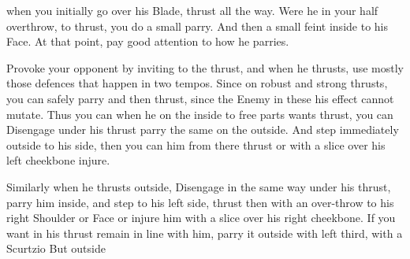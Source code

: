 \newpage


\newpage


when you initially go over his Blade, thrust all the way. Were he in your half overthrow, to thrust, you do a small parry. And then a small feint inside to his Face. At that point, pay good attention to how he parries.


Provoke your opponent by inviting to the thrust, and when he thrusts, use mostly those defences that happen in two tempos. Since on robust and strong thrusts, you can safely parry and then thrust, since the Enemy in these his effect cannot mutate. Thus you can when he on the inside to free parts wants thrust, you can Disengage under his thrust parry the same on the outside. And step immediately outside to his side, then you can him from there thrust or with a slice over his left cheekbone injure.

\exercise{}

Similarly when he thrusts outside, Disengage in the same way under his thrust, parry him inside, and step to his left side, thrust then with an over-throw to his right Shoulder or Face or injure him with a slice over his right cheekbone. If you want in his thrust remain in line with him, parry it outside with left third, with a Scurtzio But outside
